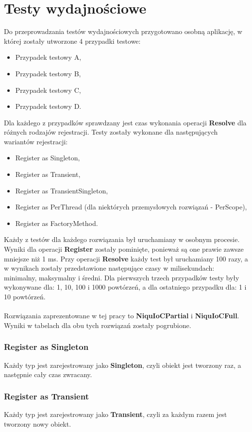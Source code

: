 \documentclass[12pt]{article}
\begin{document}
\clearpage
\section{Testy wydajnościowe}
Do przeprowadzania testów wydajnościowych przygotowano osobną aplikację, w której zostały utworzone 4 przypadki testowe:
\begin{itemize}
	\item Przypadek testowy A,
	\item Przypadek testowy B,
	\item Przypadek testowy C,
	\item Przypadek testowy D.
\end{itemize}
Dla każdego z przypadków sprawdzany jest czas wykonania operacji \textbf{Resolve} dla różnych rodzajów rejestracji. Testy zostały wykonane dla następujących wariantów rejestracji:
\begin{itemize}
	\item Register as Singleton,
	\item Register as Transient,
	\item Register as TransientSingleton,
	\item Register as PerThread (dla niektórych przemysłowych rozwiązań - PerScope),
	\item Register as FactoryMethod.
\end{itemize}
Każdy z testów dla każdego rozwiązania był uruchamiany w osobnym procesie. Wyniki dla operacji \textbf{Register} zostały pominięte, ponieważ są one prawie zawsze mniejsze niż 1 ms. Przy operacji \textbf{Resolve} każdy test był uruchamiany 100 razy, a w wynikach zostały przedstawione następujące czasy w milisekundach: minimalny, maksymalny i średni. Dla pierwszych trzech przypadków testy były wykonywane dla: 1, 10, 100 i 1000 powtórzeń, a dla ostatniego przypadku dla: 1 i 10 powtórzeń.\\
\\
Rozwiązania zaprezentowane w tej pracy to \textbf{NiquIoCPartial} i \textbf{NiquIoCFull}. Wyniki w tabelach dla obu tych rozwiązań zostały pogrubione.

\subsubsection{Register as Singleton}
Każdy typ jest zarejestrowany jako \textbf{Singleton}, czyli obiekt jest tworzony raz, a następnie cały czas zwracany.

\subsubsection{Register as Transient}
Każdy typ jest zarejestrowany jako \textbf{Transient}, czyli za każdym razem jest tworzony nowy obiekt.
\end{document}

